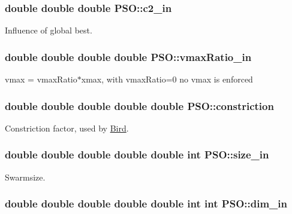 \hypertarget{classPSO_f98d12b44572b19bce362214e62fe02e}{
\subsubsection{\setlength{\rightskip}{0pt plus 5cm}double double double {\bf PSO::c2\_\-in}}}
\label{classPSO_f98d12b44572b19bce362214e62fe02e}


Influence of global best. 

\hypertarget{classPSO_2f47fe19b9f6c0640ea4810a0e60bc34}{
\subsubsection{\setlength{\rightskip}{0pt plus 5cm}double double double double {\bf PSO::vmaxRatio\_\-in}}}
\label{classPSO_2f47fe19b9f6c0640ea4810a0e60bc34}


vmax = vmaxRatio$\ast$xmax, with vmaxRatio=0 no vmax is enforced 

\hypertarget{classPSO_96a4c6267239fd7132f9528cb3ba883b}{
\subsubsection{\setlength{\rightskip}{0pt plus 5cm}double double double double double {\bf PSO::constriction}}}
\label{classPSO_96a4c6267239fd7132f9528cb3ba883b}


Constriction factor, used by \hyperlink{classBird}{Bird}. 

\hypertarget{classPSO_27e09b7ad510b428a4d8017e3cbec742}{
\subsubsection{\setlength{\rightskip}{0pt plus 5cm}double double double double double int {\bf PSO::size\_\-in}}}
\label{classPSO_27e09b7ad510b428a4d8017e3cbec742}


Swarmsize. 

\hypertarget{classPSO_e65adcb9ab4ffcbbaae4af0c4268e69f}{
\subsubsection{\setlength{\rightskip}{0pt plus 5cm}double double double double double int int {\bf PSO::dim\_\-in}}}
\label{classPSO_e65adcb9ab4ffcbbaae4af0c4268e69f}


